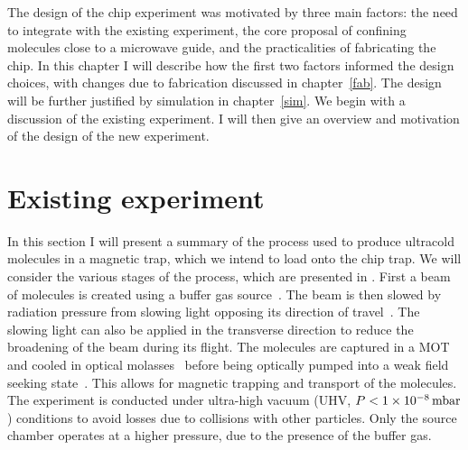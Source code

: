 The design of the \CaF{} chip experiment was motivated by three main factors:
the need to integrate with the existing experiment, the core proposal of
confining molecules close to a microwave guide, and the practicalities of
fabricating the chip. In this chapter I will describe how the first two factors
informed the design choices, with changes due to fabrication discussed in
chapter~\ref{fab}. The design will be further justified by simulation in
chapter~\ref{sim}.
%
We begin with a discussion of the existing experiment. I will then give an
overview and motivation of the design of the new experiment.


\section{Existing \CaF{} experiment}
\label{overview:existing}

In this section I will present a summary of the process used to produce
ultracold \CaF{} molecules in a magnetic trap, which we intend to load onto the
chip trap. We will consider the various stages of the process, which are
presented in . First a beam of \CaF{}
molecules is created using a buffer gas source~\cite{Truppe2018}. The beam is
then slowed by radiation pressure from slowing light opposing its direction of
travel~\cite{Truppe2017a}. The slowing light can also be applied in the
transverse direction to reduce the broadening of the beam during its flight.
The molecules are captured in a MOT~\cite{Williams2017} and cooled in optical
molasses~\cite{Truppe2017} before being optically pumped into a weak field
seeking state~\cite{WilliamsMagnetic2018}. This allows for magnetic trapping
and transport of the molecules. The experiment is conducted under ultra-high
vacuum (UHV, $P<\SI{1E-8}{\milli\bar}$) conditions to avoid losses due to
collisions with other particles. Only the source chamber operates at a higher
pressure, due to the presence of the buffer gas.

